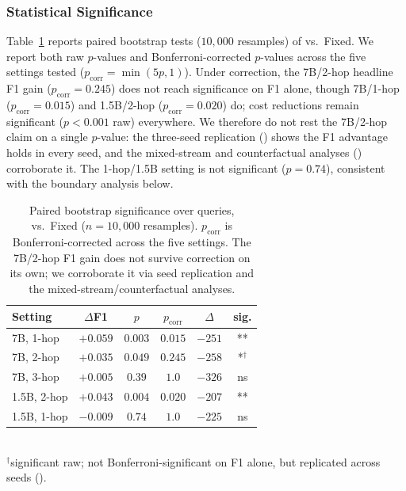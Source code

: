 \subsubsection{Statistical Significance}
\label{sec:exp-sig}

Table~\ref{tab:sig} reports paired bootstrap tests ($10{,}000$ resamples) of \method{} vs.\ Fixed. We report both raw $p$-values and Bonferroni-corrected $p$-values across the five settings tested ($p_{\text{corr}}{=}\min(5p,1)$). Under correction, the 7B/2-hop headline F1 gain ($p_{\text{corr}}{=}0.245$) does not reach significance on F1 alone, though 7B/1-hop ($p_{\text{corr}}{=}0.015$) and 1.5B/2-hop ($p_{\text{corr}}{=}0.020$) do; cost reductions remain significant ($p<0.001$ raw) everywhere. We therefore do not rest the 7B/2-hop claim on a single $p$-value: the three-seed replication () shows the F1 advantage holds in every seed, and the mixed-stream and counterfactual analyses () corroborate it. The 1-hop/1.5B setting is not significant ($p{=}0.74$), consistent with the boundary analysis below.

\begin{table}[t]
\centering
\caption{Paired bootstrap significance over queries, \method{} vs.\ Fixed ($n{=}10{,}000$ resamples). $p_{\text{corr}}$ is Bonferroni-corrected across the five settings. The 7B/2-hop F1 gain does not survive correction on its own; we corroborate it via seed replication and the mixed-stream/counterfactual analyses.}
\label{tab:sig}
\small
\begin{tabular}{@{}lccccc@{}}
\toprule
Setting & $\Delta$F1 & $p$ & $p_{\text{corr}}$ & $\Delta$\Toks{} & sig. \\
\midrule
7B, 1-hop & $+0.059$ & $0.003$ & $0.015$ & $-251$ & ** \\
7B, 2-hop & $+0.035$ & $0.049$ & $0.245$ & $-258$ & *$^{\dagger}$ \\
7B, 3-hop & $+0.005$ & $0.39$ & $1.0$ & $-326$ & ns \\
1.5B, 2-hop & $+0.043$ & $0.004$ & $0.020$ & $-207$ & ** \\
1.5B, 1-hop & $-0.009$ & $0.74$ & $1.0$ & $-225$ & ns \\
\bottomrule
\end{tabular}
\vspace{1pt}\\\footnotesize $^{\dagger}$significant raw; not Bonferroni-significant on F1 alone, but replicated across seeds ().
\end{table}

